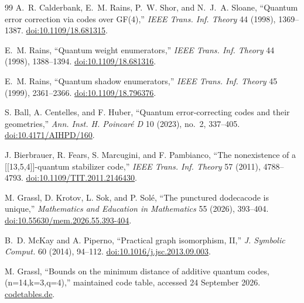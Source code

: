 \documentclass[11pt]{article}
\begin{document}
\begin{thebibliography}{99}
A.~R. Calderbank, E.~M. Rains, P.~W. Shor, and N.~J.~A. Sloane,
``Quantum error correction via codes over GF(4),''
\emph{IEEE Trans. Inf. Theory} 44 (1998), 1369--1387.
\href{https://doi.org/10.1109/18.681315}{doi:10.1109/18.681315}.

E.~M. Rains, ``Quantum weight enumerators,''
\emph{IEEE Trans. Inf. Theory} 44 (1998), 1388--1394.
\href{https://doi.org/10.1109/18.681316}{doi:10.1109/18.681316}.

E.~M. Rains, ``Quantum shadow enumerators,''
\emph{IEEE Trans. Inf. Theory} 45 (1999), 2361--2366.
\href{https://doi.org/10.1109/18.796376}{doi:10.1109/18.796376}.

S. Ball, A. Centelles, and F. Huber, ``Quantum error-correcting codes and their geometries,''
\emph{Ann. Inst. H. Poincaré D} 10 (2023), no.~2, 337--405.
\href{https://doi.org/10.4171/AIHPD/160}{doi:10.4171/AIHPD/160}.

J. Bierbrauer, R. Fears, S. Marcugini, and F. Pambianco,
``The nonexistence of a [[13,5,4]]-quantum stabilizer code,''
\emph{IEEE Trans. Inf. Theory} 57 (2011), 4788--4793.
\href{https://doi.org/10.1109/TIT.2011.2146430}{doi:10.1109/TIT.2011.2146430}.

M. Grassl, D. Krotov, L. Sok, and P. Solé,
``The punctured dodecacode is unique,''
\emph{Mathematics and Education in Mathematics} 55 (2026), 393--404.
\href{https://doi.org/10.55630/mem.2026.55.393-404}{doi:10.55630/mem.2026.55.393-404}.

B.~D. McKay and A. Piperno, ``Practical graph isomorphism, II,''
\emph{J. Symbolic Comput.} 60 (2014), 94--112.
\href{https://doi.org/10.1016/j.jsc.2013.09.003}{doi:10.1016/j.jsc.2013.09.003}.

M. Grassl, ``Bounds on the minimum distance of additive quantum codes, (n=14,k=3,q=4),''
maintained code table, accessed 24 September 2026.
\href{https://codetables.de/QECC.php?k=3&n=14&q=4}{codetables.de}.
\end{thebibliography}
\end{document}
